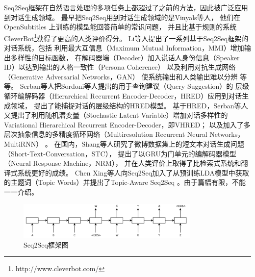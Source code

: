 Seq2Seq框架在自然语言处理的多项任务上都超过了之前的方法，因此被广泛应用到对话生成领域。
最早把Seq2Seq用到对话生成领域的是Vinyals等人，
他们在OpenSubtitles
上训练的模型能回答简单的常识问题，
并且比基于规则的系统CleverBot\footnote{http://www.cleverbot.com/}获得了更高的人类评价得分。
Li等人提出了一系列基于Seq2Seq框架的对话系统，包括
利用最大互信息（Maximum Mutual Information，MMI）增加输出多样性的目标函数，
在解码器端（Decoder）加入说话人身份信息（Speaker ID）以达到输出的人格一致性（Persona Coherence）
以及利用对抗生成网络（Generative Adversarial Networks，GAN）
使系统输出和人类输出难以分辨
等等。
Serban等人把Sordoni等人提出的用于查询建议（Query Suggestion）的
层级循环编解码器（Hierarchical Recurrent Encoder-Decoder，HRED）应用到对话生成领域， 提出了能捕捉对话的层级结构的HRED模型。
基于HRED，Serban等人又提出了利用随机潜变量（Stochastic Latent Variable）增加对话多样性的Variational Hierarchical Recurrent Encoder-Decoder，即VHRED；
以及加入了多层次抽象信息的多精度循环网络（Multiresolution Recurrent Neural Networks，MultiRNN）
。
在国内，Shang等人研究了微博数据集上的短文本对话生成问题（Short-Text-Conversation，STC），
提出了以GRU为门单元的编解码器模型（Neural Response Machine，NRM），
并在人类评价上取得了比检索式系统和翻译式系统更好的成绩。
Chen Xing等人向Seq2Seq加入了从预训练LDA模型中获取的主题词（Topic Words）并提出了Topic-Aware Seq2Seq
。由于篇幅有限，不能一一介绍。

\begin{figure}[H]
    \centering
    \includegraphics[width=0.8\textwidth]{figure/Seq2Seq.png}
    \caption{Seq2Seq框架图}
    \label{fig:Seq2Seq}
\end{figure}

